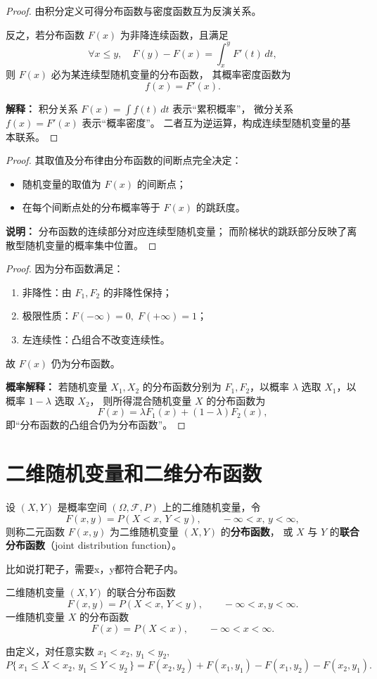 \begin{proof}
由积分定义可得分布函数与密度函数互为反演关系。

反之，若分布函数 \( F(x) \) 为非降连续函数，且满足
\[
\forall x \le y,\quad F(y) - F(x) = \int_x^y F'(t)\,dt,
\]
则 \( F(x) \) 必为某连续型随机变量的分布函数，
其概率密度函数为
\[
f(x) = F'(x).
\]

\textbf{解释：}  
积分关系 \( F(x) = \int f(t)\,dt \) 表示“累积概率”，  
微分关系 \( f(x) = F'(x) \) 表示“概率密度”。  
二者互为逆运算，构成连续型随机变量的基本联系。
\end{proof}
\begin{proof}
其取值及分布律由分布函数的间断点完全决定：
\begin{itemize}
  \item 随机变量的取值为 \( F(x) \) 的间断点；
  \item 在每个间断点处的分布概率等于 \( F(x) \) 的跳跃度。
\end{itemize}

\textbf{说明：}  
分布函数的连续部分对应连续型随机变量；
而阶梯状的跳跃部分反映了离散型随机变量的概率集中位置。
\end{proof}
\begin{proof}
因为分布函数满足：
\begin{enumerate}
  \item 非降性：由 $F_1,F_2$ 的非降性保持；
  \item 极限性质：$F(-\infty)=0,\; F(+\infty)=1$；
  \item 左连续性：凸组合不改变连续性。
\end{enumerate}
故 $F(x)$ 仍为分布函数。

\medskip
\textbf{概率解释：}  
若随机变量 $X_1,X_2$ 的分布函数分别为 $F_1,F_2$，以概率 $\lambda$ 选取 $X_1$，以概率 $1-\lambda$ 选取 $X_2$，  
则所得混合随机变量 $X$ 的分布函数为
\[
F(x)=\lambda F_1(x)+(1-\lambda)F_2(x),
\]
即“分布函数的凸组合仍为分布函数”。
\end{proof}
\section{二维随机变量和二维分布函数}
\begin{definition}[二维随机变量的分布函数]
设 $(X,Y)$ 是概率空间 $(\Omega, \mathscr{F}, P)$ 上的二维随机变量，令
\[
F(x,y) = P(X < x,\, Y < y), \qquad -\infty < x,\, y < \infty,
\tag{2.2.1}
\]
则称二元函数 $F(x,y)$ 为二维随机变量 $(X,Y)$ 的\textbf{分布函数}，
或 $X$ 与 $Y$ 的\textbf{联合分布函数}（joint distribution function）。
\end{definition}
比如说打靶子，需要x，y都符合靶子内。
\begin{compare}[]
二维随机变量 $(X,Y)$ 的联合分布函数 
\[
F(x,y) = P(X < x,\, Y < y), \qquad -\infty < x, y < \infty.
\]
\tcblower
一维随机变量 $X$ 的分布函数
\[
F(x) = P(X < x), \qquad -\infty < x < \infty.
\]
\end{compare}
由定义，对任意实数 $x_1 < x_2,\, y_1 < y_2,$
\[
P\{\,x_1 \le X < x_2,\, y_1 \le Y < y_2\,\}
= F(x_2,y_2) + F(x_1,y_1) - F(x_1,y_2) - F(x_2,y_1).
\]

